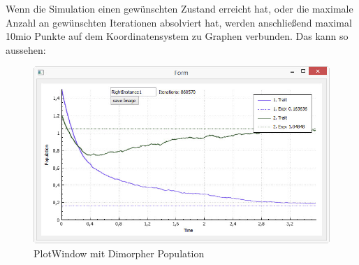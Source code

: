 \documentclass{article}
\begin{document}
		Wenn die Simulation  einen gewünschten Zustand erreicht hat, oder die maximale Anzahl an gewünschten Iterationen absolviert hat, werden anschließend maximal 10mio Punkte auf dem Koordinatensystem zu Graphen verbunden. Das kann so aussehen:
		\begin{figure}[H]
			\centering
			\includegraphics[width=0.7\linewidth]{./Pictures/PlotWindow_smallBPDL}
			\caption[PlotWindow]{PlotWindow mit Dimorpher Population}
			\label{PlotWindow}
		\end{figure}
		
		
\end{document}
